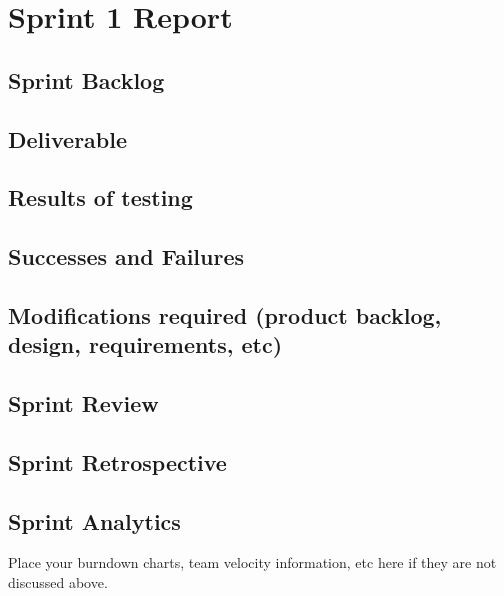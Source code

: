 
\section{Sprint 1 Report}
\subsection{Sprint Backlog}
\subsection{Deliverable}
\subsection{Results of testing}
\subsection{Successes and Failures}
\subsection{Modifications required (product backlog, design, requirements, etc)}
\subsection{Sprint Review}
\subsection{Sprint Retrospective}
\subsection{Sprint Analytics} 
Place your burndown charts, team velocity information, etc here if they are not discussed above.